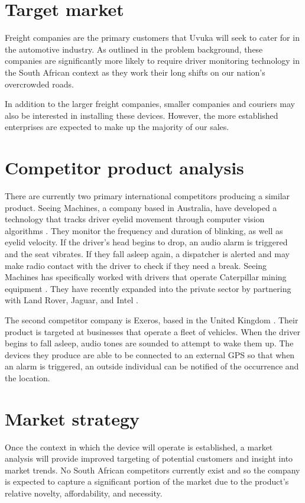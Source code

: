 \section{Target market}
Freight companies are the primary customers that Uvuka will seek to cater for in the automotive industry. As outlined in the problem background, these companies are significantly more likely to require driver monitoring technology in the South African context as they work their long shifts on our nation's overcrowded roads.

In addition to the larger freight companies, smaller companies and couriers may also be interested in installing these devices. However, the more established enterprises are expected to make up the majority of our sales.

\section{Competitor product analysis}
\label{sec:competitoranalysis}
There are currently two primary international competitors producing a similar product. Seeing Machines, a company based in Australia, have developed a technology that tracks driver eyelid movement through computer vision algorithms \cite{SeeingMachinesWebsite}. They monitor the frequency and duration of blinking, as well as eyelid velocity. If the driver’s head begins to drop, an audio alarm is triggered and the seat vibrates. If they fall asleep again, a dispatcher is alerted and may make radio contact with the driver to check if they need a break. Seeing Machines has specifically worked with drivers that operate Caterpillar mining equipment \cite{SeeingMachinesWired}. They have recently expanded into the private sector by partnering with Land Rover, Jaguar, and Intel \cite{sm_similarities}.

\pagebreak
The second competitor company is Exeros, based in the United Kingdom \cite{Exeros}. Their product is targeted at businesses that operate a fleet of vehicles. When the driver begins to fall asleep, audio tones are sounded to attempt to wake them up. The devices they produce are able to be connected to an external GPS so that when an alarm is triggered, an outside individual can be notified of the occurrence and the location.

\section{Market strategy}
Once the context in which the device will operate is established, a market analysis will provide improved targeting of potential customers and insight into market trends. No South African competitors currently exist and so the company is expected to capture a significant portion of the market due to the product’s relative novelty, affordability, and necessity.

